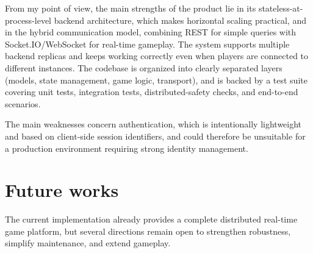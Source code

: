 \documentclass{scrartcl}
\begin{document}
From my point of view, the main strengths of the product lie in its
stateless-at-process-level backend architecture, which makes horizontal scaling
practical, and in the hybrid communication model, combining REST for simple
queries with Socket.IO/WebSocket for real-time gameplay. The system supports
multiple backend replicas and keeps working correctly even when players are
connected to different instances. The codebase is organized into clearly separated
layers (models, state management, game logic, transport), and is backed by a test
suite covering unit tests, integration tests, distributed-safety checks, and
end-to-end scenarios.

The main weaknesses concern authentication, which is intentionally lightweight and
based on client-side session identifiers, and could therefore be unsuitable for a
production environment requiring strong identity management.

\section{Future works}\label{future-works}

The current implementation already provides a complete distributed real-time game
platform, but several directions remain open to strengthen robustness, simplify
maintenance, and extend gameplay.
\end{document}
